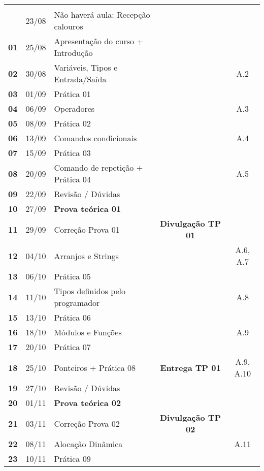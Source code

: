 \documentclass[a4paper, 11pt]{article}
\begin{document}
\begin{longtable}{>{\bfseries}ccl>{\bfseries}cc}
\midrule
\endhead
\midrule\multicolumn{5}{r}{Continua na página seguinte} \\
\endfoot
\endlastfoot
\rowcolor{green!25} & 23/08 & Não haverá aula: Recepção calouros &  & \\
\rowcolor{yellow!25} 01 & 25/08 & Apresentação do curso + Introdução &  & \\
\rowcolor{gray!25} 02 & 30/08 & Variáveis, Tipos e Entrada/Saída &  & A.2\\
\rowcolor{yellow!25} 03 & 01/09 & Prática 01 &  & \\
\rowcolor{gray!25} 04 & 06/09 & Operadores &  & A.3\\
\rowcolor{yellow!25} 05 & 08/09 & Prática 02 &  & \\
\rowcolor{gray!25} 06 & 13/09 & Comandos condicionais &  & A.4\\
\rowcolor{yellow!25} 07 & 15/09 & Prática 03 &  & \\
\rowcolor{gray!25} 08 & 20/09 & Comando de repetição + Prática 04 &  & A.5\\
\rowcolor{yellow!25} 09 & 22/09 & Revisão / Dúvidas &  & \\
\rowcolor{red!15} 10 & 27/09 & \textbf{Prova teórica 01} &  & \\
\rowcolor{yellow!25} 11 & 29/09 & Correção Prova 01 & Divulgação TP 01 & \\
\rowcolor{gray!25} 12 & 04/10 & Arranjos e Strings &  & A.6, A.7\\
\rowcolor{yellow!25} 13 & 06/10 & Prática 05 &  & \\
\rowcolor{gray!25} 14 & 11/10 & Tipos definidos pelo programador &  & A.8\\
\rowcolor{yellow!25} 15 & 13/10 & Prática 06 &  & \\
\rowcolor{gray!25} 16 & 18/10 & Módulos e Funções &  & A.9\\
\rowcolor{yellow!25} 17 & 20/10 & Prática 07 &  & \\
\rowcolor{gray!25} 18 & 25/10 & Ponteiros + Prática 08 & Entrega TP 01 & A.9, A.10\\
\rowcolor{yellow!25} 19 & 27/10 & Revisão / Dúvidas &  & \\
\rowcolor{red!15} 20 & 01/11 & \textbf{Prova teórica 02} &  & \\
\rowcolor{yellow!25} 21 & 03/11 & Correção Prova 02 & Divulgação TP 02 & \\
\rowcolor{gray!25} 22 & 08/11 & Alocação Dinâmica &  & A.11\\
\rowcolor{yellow!25} 23 & 10/11 & Prática 09 &  & \\

\end{longtable}
\end{document}
